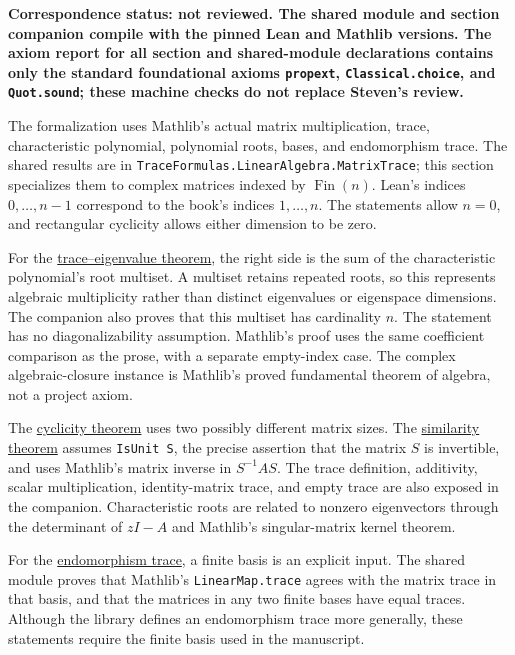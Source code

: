 \textbf{Correspondence status: not reviewed. The shared module and section companion compile with the pinned Lean and Mathlib versions. The axiom report for all section and shared-module declarations contains only the standard foundational axioms \texttt{propext}, \texttt{Classical.choice}, and \texttt{Quot.sound}; these machine checks do not replace Steven's review.}

The formalization uses Mathlib's actual matrix multiplication, trace, characteristic polynomial, polynomial roots, bases, and endomorphism trace. The shared results are in \texttt{TraceFormulas.LinearAlgebra.MatrixTrace}; this section specializes them to complex matrices indexed by $\operatorname{Fin}(n)$. Lean's indices $0,\ldots,n-1$ correspond to the book's indices $1,\ldots,n$. The statements allow $n=0$, and rectangular cyclicity allows either dimension to be zero.

For the \hyperref[linear-algebra.trace-eigenvalue-sum]{trace--eigenvalue theorem}, the right side is the sum of the characteristic polynomial's root multiset. A multiset retains repeated roots, so this represents algebraic multiplicity rather than distinct eigenvalues or eigenspace dimensions. The companion also proves that this multiset has cardinality $n$. The statement has no diagonalizability assumption. Mathlib's proof uses the same coefficient comparison as the prose, with a separate empty-index case. The complex algebraic-closure instance is Mathlib's proved fundamental theorem of algebra, not a project axiom.

The \hyperref[linear-algebra.trace-cyclic]{cyclicity theorem} uses two possibly different matrix sizes. The \hyperref[linear-algebra.trace-similarity]{similarity theorem} assumes \texttt{IsUnit S}, the precise assertion that the matrix $S$ is invertible, and uses Mathlib's matrix inverse in $S^{-1}AS$. The trace definition, additivity, scalar multiplication, identity-matrix trace, and empty trace are also exposed in the companion. Characteristic roots are related to nonzero eigenvectors through the determinant of $zI-A$ and Mathlib's singular-matrix kernel theorem.

For the \hyperref[linear-algebra.endomorphism-trace]{endomorphism trace}, a finite basis is an explicit input. The shared module proves that Mathlib's \texttt{LinearMap.trace} agrees with the matrix trace in that basis, and that the matrices in any two finite bases have equal traces. Although the library defines an endomorphism trace more generally, these statements require the finite basis used in the manuscript.

